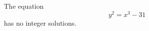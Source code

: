 \begin{proposition}
    The equation
\[
    y^2=x^3-31
\]
    has no integer solutions.
\end{proposition}
